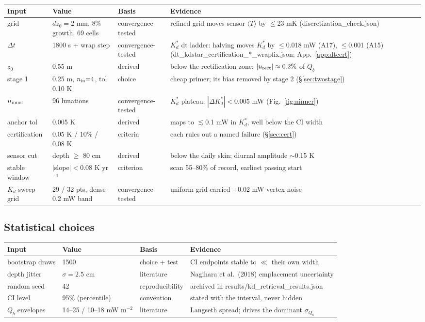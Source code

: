 \documentclass[11pt]{report}
\newcommand{\Tm}{\langle T\rangle}
\newcommand{\code}[1]{{\ttfamily\small #1}}
\begin{document}
\begin{center}\footnotesize
\begin{tabular}{@{}llll@{}}
\toprule
Input & Value & Basis & Evidence \\
\midrule
grid & $dz_0{=}2$ mm, 8\% growth, 69 cells & convergence-tested & refined grid moves sensor $\Tm$ by $\leq$23 mK (\code{discretization\_check.json}) \\
$\Delta t$ & 1800 s + wrap step & convergence-tested & $K_d^{*}$ dt ladder: halving moves $K_d^{*}$ by $\leq$0.018 mW (A17), $\leq$0.001 (A15) (\code{dt\_kdstar\_certification\_*\_wrapfix.json}; App.~\ref{app:dtcert}) \\
$z_0$ & 0.55 m & derived & below the rectification zone; $|u_{\rm rect}|\approx0.2\%$ of $Q_b$ \\
stage 1 & 0.25 m, $n_{\rm in}{=}4$, tol 0.10 K & choice & cheap primer; its bias removed by stage 2 (\S\ref{sec:twostage}) \\
$n_{\rm inner}$ & 96 lunations & convergence-tested & $K_d^{*}$ plateau, $|\Delta K_d^{*}|<0.005$ mW (Fig.~\ref{fig:ninner}) \\
anchor tol & 0.005 K & derived & maps to $\lesssim$0.1 mW in $K_d^{*}$, well below the CI width \\
certification & 0.05 K / 10\% / 0.08 K & criteria & each rules out a named failure (\S\ref{sec:cert}) \\
sensor cut & depth $\geq$ 80 cm & derived & below the daily skin; diurnal amplitude $\sim$0.15 K \\
stable window & $|$slope$| < 0.08$ K yr$^{-1}$ & criterion & scan 55--80\% of record, earliest passing start \\
$K_d$ sweep grid & 29 / 32 pts, dense 0.2 mW band & convergence-tested & uniform grid carried $\pm$0.02 mW vertex noise \\
\bottomrule
\end{tabular}
\end{center}

\subsection*{Statistical choices}

\begin{center}\footnotesize
\begin{tabular}{@{}llll@{}}
\toprule
Input & Value & Basis & Evidence \\
\midrule
bootstrap draws & 1500 & choice + test & CI endpoints stable to $\ll$ their own width \\
depth jitter & $\sigma = 2.5$ cm & literature & Nagihara et al.\ (2018) emplacement uncertainty \\
random seed & 42 & reproducibility & archived in \code{results/kd\_retrieval\_results.json} \\
CI level & 95\% (percentile) & convention & stated with the interval, never hidden \\
$Q_b$ envelopes & 14--25 / 10--18 mW m$^{-2}$ & literature & Langseth spread; drives the dominant $\sigma_{Q_b}$ \\
\bottomrule
\end{tabular}
\end{center}
\end{document}
